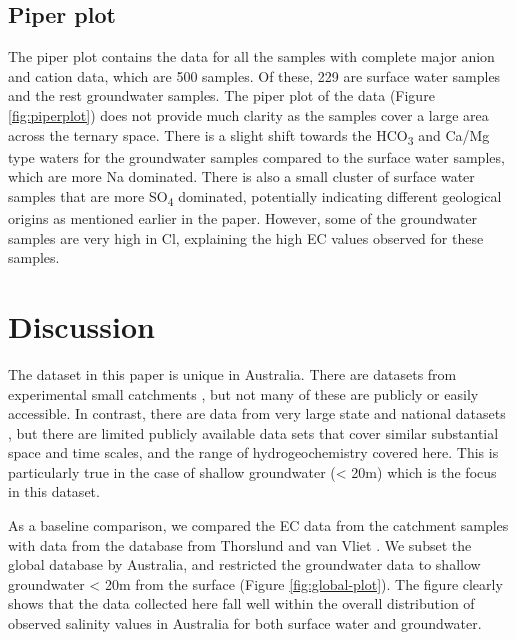 \documentclass[, manuscript]{copernicus}
\begin{document}
\subsection{Piper plot}

The piper plot contains the data for all the samples with complete major
anion and cation data, which are 500 samples. Of these, 229 are surface
water samples and the rest groundwater samples. The piper plot of the
data (Figure \ref{fig:piperplot}) does not provide much clarity as the
samples cover a large area across the ternary space. There is a slight
shift towards the HCO\textsubscript{3} and Ca/Mg type waters for the
groundwater samples compared to the surface water samples, which are
more Na dominated. There is also a small cluster of surface water
samples that are more SO\textsubscript{4} dominated, potentially
indicating different geological origins as mentioned earlier in the
paper. However, some of the groundwater samples are very high in Cl,
explaining the high EC values observed for these samples.

\section{Discussion}

The dataset in this paper is unique in Australia. There are datasets
from experimental small catchments
\citep[i.e.][]{Hughes2007, crosbie2007, Summerell2006}, but not many of
these are publicly or easily accessible. In contrast, there are data
from very large state and national datasets
\citep[i.e.][]{Jolly2001, thorslund_vanvliet2020}, but there are limited
publicly available data sets that cover similar substantial space and
time scales, and the range of hydrogeochemistry covered here. This is
particularly true in the case of shallow groundwater (\textless{} 20m)
which is the focus in this dataset.

As a baseline comparison, we compared the EC data from the catchment
samples with data from the database from Thorslund and van Vliet
\citeyearpar{thorslund_vanvliet2020}. We subset the global database by
Australia, and restricted the groundwater data to shallow groundwater
\textless{} 20m from the surface (Figure \ref{fig:global-plot}). The
figure clearly shows that the data collected here fall well within the
overall distribution of observed salinity values in Australia for both
surface water and groundwater.
\end{document}
